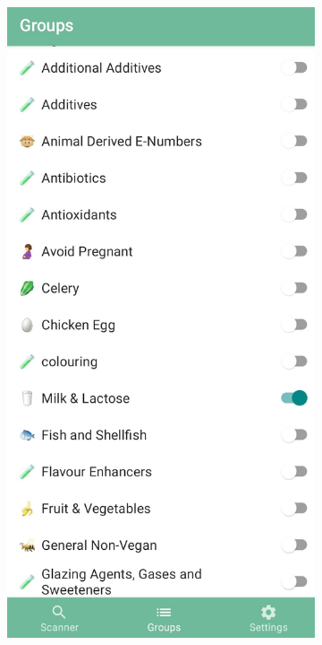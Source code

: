 \begin{figure}[h]
\begin{subfigure}{0.3\textwidth}
        \includegraphics[width=0.9\linewidth]{Figures/soosee-2.jpg}
        \caption{}
        \label{fig:soosee-2}
    \end{subfigure}
    \begin{subfigure}{0.3\textwidth}
        \centering

\end{subfigure}
\end{figure}
